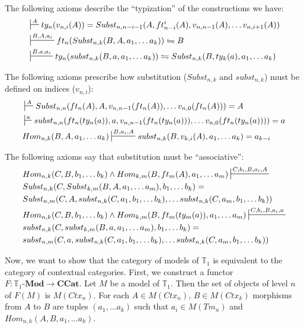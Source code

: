 \documentclass[reqno]{amsart}
\theoremstyle{definition}
\theoremstyle{remark}
\newcommand{\cat}[1]{\mathbf{#1}}
\newcommand{\ccat}{\cat{CCat}}
\newcommand{\Mod}[1]{#1\text{-}\cat{Mod}}
\numberwithin{figure}{section}
\begin{document}
The following axioms describe the ``typization'' of the constructions we have:
\begin{align}
\label{ax:type-var}
& \sststile{}{A}         ty_n(v_{n,i}(A)) = Subst_{n,n-i-1}(A, ft^i_{n-i}(A), v_{n,n-1}(A), \ldots v_{n,i+1}(A)) \\
\label{ax:type-Subst}
& \sststile{}{B, A, a_i} ft_n(Subst_{n,k}(B, A, a_1, \ldots a_k)) \leftrightharpoons B \\
\label{ax:type-subst}
& \sststile{}{B, a, a_i} ty_n(subst_{n,k}(B, a, a_1, \ldots a_k)) \leftrightharpoons Subst_{n,k}(B, ty_k(a), a_1, \ldots a_k)
\end{align}

The following axioms prescribe how substitution ($Subst_{n,k}$ and $subst_{n,k}$) must be defined on indices ($v_{n,i}$):
\begin{align}
\label{ax:Subst-var}
& \sststile{}{A}         Subst_{n,n}(ft_n(A), A, v_{n,n-1}(ft_n(A)), \ldots v_{n,0}(ft_n(A))) = A \\
\label{ax:subst-var}
& \sststile{}{a}         subst_{n,n}(ft_n(ty_n(a)), a, v_{n,n-1}(ft_n(ty_n(a))), \ldots v_{n,0}(ft_n(ty_n(a)))) = a \\
\label{ax:var-subst}
& Hom_{n,k}(B, A, a_1, \ldots a_k) \sststile{}{B, a_i, A} subst_{n,k}(B, v_{k,i}(A), a_1, \ldots a_k) = a_{k-i}
\end{align}

The following axioms say that substitution must be ``associative'':
\begin{align}
\label{ax:Subst-Subst}
& Hom_{n,k}(C, B, b_1, \ldots b_k) \land Hom_{k,m}(B, ft_m(A), a_1, \ldots a_m) \sststile{}{C, b_i, B, a_i, A} \\ \notag
& Subst_{n,k}(C, Subst_{k,m}(B, A, a_1, \ldots a_m), b_1, \ldots b_k) = \\ \notag
& Subst_{n,m}(C, A, subst_{n,k}(C, a_1, b_1, \ldots b_k), \ldots subst_{n,k}(C, a_m, b_1, \ldots b_k)) \\
\label{ax:subst-subst}
& Hom_{n,k}(C, B, b_1, \ldots b_k) \land Hom_{k,m}(B, ft_m(ty_m(a)), a_1, \ldots a_m) \sststile{}{C, b_i, B, a_i, a} \\ \notag
& subst_{n,k}(C, subst_{k,m}(B, a, a_1, \ldots a_m), b_1, \ldots b_k) = \\ \notag
& subst_{n,m}(C, a, subst_{n,k}(C, a_1, b_1, \ldots b_k), \ldots subst_{n,k}(C, a_m, b_1, \ldots b_k))
\end{align}

Now, we want to show that the category of models of $\mathbb{T}_1$ is equivalent to the category of contextual categories.
First, we construct a functor $F : \Mod{\mathbb{T}_1} \to \ccat$.
Let $M$ be a model of $\mathbb{T}_1$.
Then the set of objects of level $n$ of $F(M)$ is $M(Ctx_n)$.
For each $A \in M(Ctx_n)$, $B \in M(Ctx_k)$ morphisms from $A$ to $B$ are tuples $(a_1, \ldots a_k)$ such that $a_i \in M(Tm_n)$ and $Hom_{n,k}(A, B, a_1, \ldots a_k)$.
\end{document}
